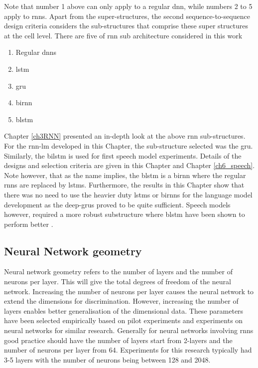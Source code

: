 Note that number 1 above can only apply to a regular \acrshort{dnn}, while numbers 2 to 5  apply to \acrshort{rnn}s.  Apart from the super-structures, the second sequence-to-sequence design criteria considers the sub-structures that comprise these super structures at the cell level.  There are five of \acrshort{rnn} sub architecture considered in this work
\begin{enumerate}
    \item Regular \acrshort{dnn}s
    \item \acrfull{lstm}
    \item \acrfull{gru}
    \item \acrlong{birnn}
    \item \acrlong{blstm}
\end{enumerate}

Chapter \ref{ch3RNN} presented an in-depth look at the above \acrshort{rnn} sub-structures.  For the \acrshort{rnn}-\acrshort{lm} developed in this Chapter, the sub-structure selected was the \acrshort{gru}. Similarly, the \acrshort{bilstm} is used for first speech model experiments. Details of the designs and selection criteria are given in this Chapter and Chapter \ref{ch6_speech}.  Note however, that as the name implies, the \acrfull{blstm} is a \acrshort{birnn} where the regular \acrshort{rnn}s are replaced by \acrshort{lstm}s.  Furthermore, the results in this Chapter show that there was no need to use the heavier duty \acrshort{lstm}s or \acrshort{birnn}s for the language model development  as the deep-\acrshort{gru}s proved to be quite sufficient. Speech models however, required a more robust substructure where \acrshort{blstm} have been shown to perform better \citep{kim2017joint}.

\subsection{Neural Network geometry}
Neural network geometry refers to the number of layers and the number of neurons per layer. This will give the total degrees of freedom of the neural network.  Increasing the number of neurons per layer causes the neural network to extend the dimensions for discrimination.  However, increasing the number of layers enables better generalisation of the dimensional data.  These parameters have been selected empirically based on pilot experiments and experiments on neural networks for similar research. Generally for neural networks involving \acrshort{rnn}s good practice should have the number of layers start from 2-layers and the number of neurons per layer from 64.  Experiments for this research typically had 3-5 layers with the number of neurons being between 128 and 2048.

